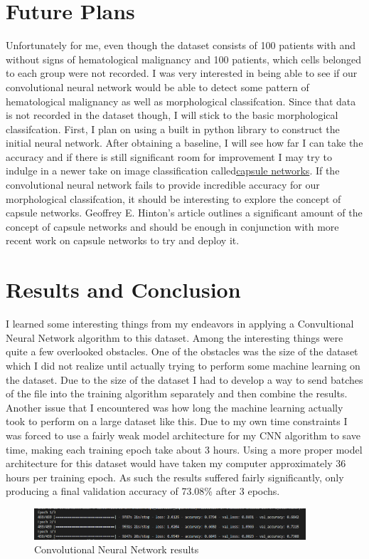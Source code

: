 \documentclass[12pt]{article}
\newcommand\tab[1][1cm]{\hspace*{#1}}
\begin{document}
\section{Future Plans}
\tab Unfortunately for me, even though the dataset consists of 100 patients with and without signs of hematological malignancy and 100 patients, which cells belonged to each group were not recorded. I was very interested in being able to see if our convolutional neural network would be able to detect some pattern of hematological malignancy as well as morphological classifcation. Since that data is not recorded in the dataset though, I will stick to the basic morphological classifcation. First, I plan on using a built in python library to construct the initial neural network. After obtaining a baseline, I will see how far I can take the accuracy and if there is still significant room for improvement I may try to indulge in a newer take on image classification called\href{https://arxiv.org/pdf/1710.09829.pdf}{capsule networks}. If the convolutional neural network fails to provide incredible accuracy for our morphological classifcation, it should be interesting to explore the concept of capsule networks. Geoffrey E. Hinton's article outlines a significant amount of the concept of capsule networks and should be enough in conjunction with more recent work on capsule networks to try and deploy it.


\newpage
\section{Results and Conclusion}
\tab I learned some interesting things from my endeavors in applying a Convultional Neural Network algorithm to this dataset. Among the interesting things were quite a few overlooked obstacles. One of the obstacles was the size of the dataset which I did not realize until actually trying to perform some machine learning on the dataset. Due to the size of the dataset I had to develop a way to send batches of the file into the training algorithm separately and then combine the results. Another issue that I encountered was how long the machine learning actually took to perform on a large dataset like this. Due to my own time constraints I was forced to use a fairly weak model architecture for my CNN algorithm to save time, making each training epoch take about 3 hours. Using a more proper model architecture for this dataset would have taken my computer approximately 36 hours per training epoch. As such the results suffered fairly significantly, only producing a final validation accuracy of 73.08\% after 3 epochs.
\begin{figure}[!htb]
		\centering
		\includegraphics[width=0.9\textwidth]{ml_results.png}
		\caption{\label{: } Convolutional Neural Network results}
	\end{figure} 
\end{document}
